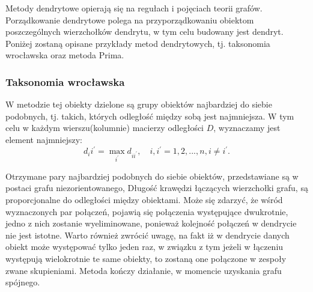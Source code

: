 \documentclass[12pt,a4paper]{report}
\begin{document}
Metody dendrytowe opierają się na regułach i pojęciach teorii grafów. Porządkowanie dendrytowe polega na przyporządkowaniu obiektom poszczególnych wierzchołków dendrytu, w tym celu budowany jest dendryt. Poniżej zostaną opisane przykłady metod dendrytowych, tj. taksonomia wrocławska oraz metoda Prima. 

\subsubsection{Taksonomia wrocławska}
\noindent


W metodzie tej obiekty dzielone są grupy obiektów najbardziej do siebie podobnych, tj. takich, których odległość między sobą jest najmniejsza. W tym celu w każdym wierszu(kolumnie) macierzy odległości $D$, wyznaczamy jest element najmniejszy: 
\begin{equation}
d_ii^{'}= \max\limits_{i^{'}} {d_{ii^{'}}}, \quad i,i^{'}=1,2,...,n, i\neq i^{'}.
\end{equation}

Otrzymane pary najbardziej podobnych do siebie obiektów, przedstawiane są w postaci grafu niezorientowanego, Długość krawędzi łączących wierzchołki grafu, są proporcjonalne do odległości między obiektami. Może się zdarzyć, że wśród wyznaczonych par połączeń, pojawią się połączenia występujące dwukrotnie, jedno z nich zostanie wyeliminowane, ponieważ kolejność połączeń w dendrycie nie jest istotne. Warto również zwrócić uwagę, na fakt iż w dendrycie danych obiekt może występować tylko jeden raz, w związku z tym jeżeli w łączeniu występują wielokrotnie te same obiekty, to zostaną one połączone w zespoły zwane skupieniami. Metoda kończy działanie, w momencie uzyskania grafu spójnego.
\end{document}
